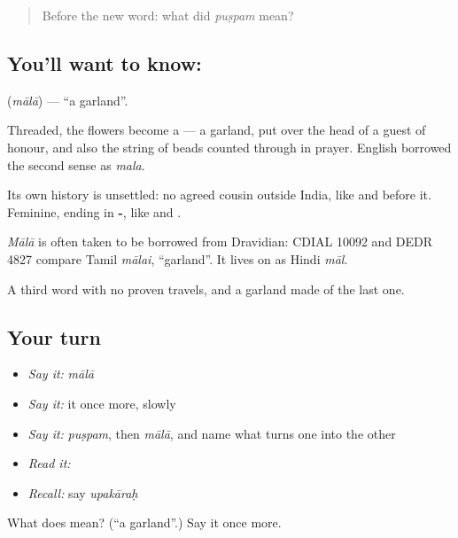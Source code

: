 \begin{quote}
Before the new word: what did \emph{puṣpam} mean?
\end{quote}

\subsection*{You'll want to know: }
\textbf{} (\emph{mālā}) — \textquotedblleft{}a garland\textquotedblright{}.

Threaded, the flowers become a \textbf{} — a garland, put over the head of a guest of honour, and also the string of beads counted through in prayer. English borrowed the second sense as \emph{mala}.

Its own history is unsettled: no agreed cousin outside India, like  and  before it. Feminine, ending in \textbf{-}, like  and .

\begin{cousinweb}
\emph{Mālā} is often taken to be borrowed from Dravidian: CDIAL 10092 and DEDR 4827 compare Tamil \emph{mālai}, \textquotedblleft{}garland\textquotedblright{}. It lives on as Hindi \emph{māl}.
\end{cousinweb}

\begin{grammarlens}[title={What you've built}]
A third word with no proven travels, and a garland made of the last one.
\end{grammarlens}

\subsection*{Your turn}
\begin{itemize}
\raggedright
  \item \emph{Say it:} \emph{mālā}
  \item \emph{Say it:} it once more, slowly
  \item \emph{Say it:} \emph{puṣpam}, then \emph{mālā}, and name what turns one into the other
  \item \emph{Read it:} \textbf{}
  \item \emph{Recall:} say \emph{upakāraḥ}
\end{itemize}

\begin{tcolorbox}[breakable,colback=teal!4,colframe=teal!35!black,title={Before you move on}]
What does  mean? (\textquotedblleft{}a garland\textquotedblright{}.) Say it once more.
\end{tcolorbox}
